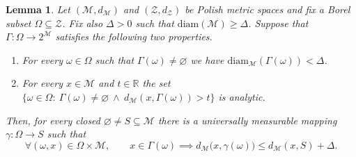 \documentclass[11pt,reqno]{amsart}
\renewcommand{\le}{\leqslant}
\renewcommand{\ge}{\geqslant}
\newcommand{\diam}{\mathrm{diam}}
\newcommand{\R}{\mathbb R}
\newtheorem{lemma}[theorem]{Lemma}
\theoremstyle{remark}
\newcommand{\MM}{\mathcal{M}}
\renewcommand{\subset}{\subseteq}
\renewcommand{\emptyset}{\varnothing}
\renewcommand{\1}{\mathbf 1}
\newcommand{\ZZ}{\mathcal{Z}}
\begin{document}
\begin{lemma}\label{lem:proximal criterion} Let $(\MM,d_\MM)$ and $(\ZZ,d_\ZZ)$ be Polish metric spaces and fix a Borel subset $\Omega\subset \ZZ$. Fix also $\Delta>0$ such that $\diam(\MM)\ge \Delta$. Suppose that $\Gamma:\Omega\to 2^\MM$  satisfies the following two properties.
\begin{enumerate}%
\item For every $\omega\in \Omega$ such that $\Gamma(\omega)\neq\emptyset$ we have $\diam_\MM(\Gamma(\omega))< \Delta$. \label{assumtion:diameter}
\item For every $x\in \MM$ and $t\in \R$ the set $\{\omega\in \Omega:\ \Gamma(\omega)\neq\emptyset \ \wedge\ d_\MM(x,\Gamma(\omega))>t\}$ is analytic. \label{assumtion:analytic}
\end{enumerate}
Then, for every closed $\emptyset\neq S\subset \MM$ there is a universally measurable mapping $\gamma:\Omega\to S$ such that
$$
\forall (\omega,x)\in \Omega\times \MM,\qquad x\in \Gamma(\omega)\implies d_\MM\big(x,\gamma(\omega)\big)\le d_\MM(x,S)+\Delta.
$$
\end{lemma}
\end{document}
